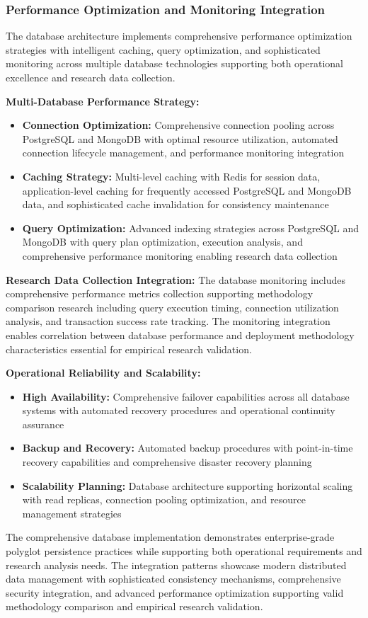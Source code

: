\subsubsection{Performance Optimization and Monitoring Integration}

The database architecture implements comprehensive performance optimization strategies with intelligent caching, query optimization, and sophisticated monitoring across multiple database technologies supporting both operational excellence and research data collection.

\textbf{Multi-Database Performance Strategy:}
\begin{itemize}
\item \textbf{Connection Optimization:} Comprehensive connection pooling across PostgreSQL and MongoDB with optimal resource utilization, automated connection lifecycle management, and performance monitoring integration
\item \textbf{Caching Strategy:} Multi-level caching with Redis for session data, application-level caching for frequently accessed PostgreSQL and MongoDB data, and sophisticated cache invalidation for consistency maintenance
\item \textbf{Query Optimization:} Advanced indexing strategies across PostgreSQL and MongoDB with query plan optimization, execution analysis, and comprehensive performance monitoring enabling research data collection
\end{itemize}

\textbf{Research Data Collection Integration:}
The database monitoring includes comprehensive performance metrics collection supporting methodology comparison research including query execution timing, connection utilization analysis, and transaction success rate tracking. The monitoring integration enables correlation between database performance and deployment methodology characteristics essential for empirical research validation.

\textbf{Operational Reliability and Scalability:}
\begin{itemize}
\item \textbf{High Availability:} Comprehensive failover capabilities across all database systems with automated recovery procedures and operational continuity assurance
\item \textbf{Backup and Recovery:} Automated backup procedures with point-in-time recovery capabilities and comprehensive disaster recovery planning
\item \textbf{Scalability Planning:} Database architecture supporting horizontal scaling with read replicas, connection pooling optimization, and resource management strategies
\end{itemize}

The comprehensive database implementation demonstrates enterprise-grade polyglot persistence practices while supporting both operational requirements and research analysis needs. The integration patterns showcase modern distributed data management with sophisticated consistency mechanisms, comprehensive security integration, and advanced performance optimization supporting valid methodology comparison and empirical research validation.